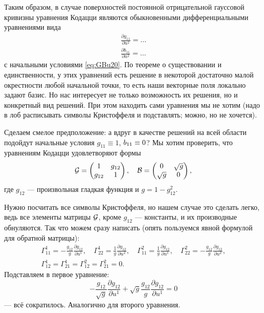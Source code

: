 Таким образом, в случае поверхностей постоянной отрицательной гауссовой кривизны уравнения Кодацци являются обыкновенными дифференциальными уравнениями вида
\begin{gather*}
	\frac{\partial g_{11}}{\partial u^2} = \ldots\\
	\frac{\partial b_{11}}{\partial u^2} = \ldots
\end{gather*}
с начальными условиями \eqref{eq:GBu20}. По теореме о существовании и единственности, у этих уравнений есть решение в некоторой достаточно малой окрестности любой начальной точки, то есть наши векторные поля локально задают базис. Но нас интересует не только возможность их решения, но и конкретный вид решений. При этом находить сами уравнения мы не хотим (надо в лоб расписывать символы Кристоффеля и подставлять; можно, но не хочется).

Сделаем смелое предположение: а вдруг в качестве решений на всей области подойдут начальные условия $g_{11} \equiv 1$, $b_{11} \hm\equiv 0$? Мы хотим проверить, что уравнениям Кодацци удовлетворяют формы
\[
	\mathcal{G} =
	\begin{pmatrix}
		1 & g_{12}\\
		g_{12} & 1
	\end{pmatrix},\quad
	\mathcal{B} =
	\begin{pmatrix}
		0 & \sqrt{g}\\
		\sqrt{g} & 0
	\end{pmatrix},
\]
где $g_{12}$ --- произвольная гладкая функция и $g = 1 - g_{12}^2$.

Нужно посчитать все символы Кристоффеля, но нашем случае это сделать легко, ведь все элементы матрицы $\mathcal{G}$, кроме $g_{12}$ --- константы, и их производные обнуляются. Так что можем сразу написать (опять пользуемся явной формулой для обратной матрицы):
\begin{equation} \label{eq:ChristoffelNegativeK}
    \begin{gathered}
        \Gamma_{11}^1 = -\frac{g_{12}}{g} \frac{\partial g_{12}}{\partial u^1}, \quad \Gamma_{22}^1 = \frac{1}{g} \frac{\partial g_{12}}{\partial u^2}, \quad \Gamma_{11}^2 = \frac{1}{g} \frac{\partial g_{12}}{\partial u^1}, \quad \Gamma_{22}^2 = -\frac{g_{12}}{g} \frac{\partial g_{12}}{\partial u^2}, \\
        \Gamma_{12}^1 = \Gamma_{21}^1 = \Gamma_{12}^2 = \Gamma_{21}^2 = 0.
    \end{gathered}
\end{equation}
Подставляем в первое уравнение:
\[
	-\frac{g_{12}}{\sqrt{g}}\frac{\partial g_{12}}{\partial u^1} + \sqrt{g}\frac{g_{12}}{g}\frac{\partial g_{12}}{\partial u^1} = 0
\]
--- всё сократилось. Аналогично для второго уравнения.

